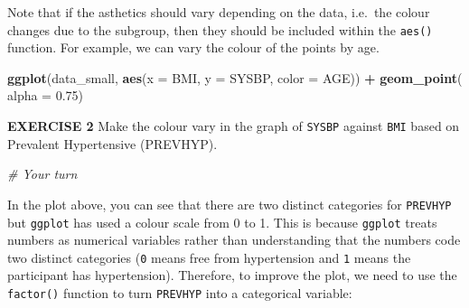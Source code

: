 \documentclass[
]{article}
\newenvironment{Shaded}{\begin{snugshade}}{\end{snugshade}}
\newcommand{\CommentTok}[1]{\textcolor[rgb]{0.56,0.35,0.01}{\textit{#1}}}
\newcommand{\DataTypeTok}[1]{\textcolor[rgb]{0.13,0.29,0.53}{#1}}
\newcommand{\DecValTok}[1]{\textcolor[rgb]{0.00,0.00,0.81}{#1}}
\newcommand{\FloatTok}[1]{\textcolor[rgb]{0.00,0.00,0.81}{#1}}
\newcommand{\KeywordTok}[1]{\textcolor[rgb]{0.13,0.29,0.53}{\textbf{#1}}}
\newcommand{\NormalTok}[1]{#1}
\newcommand{\OperatorTok}[1]{\textcolor[rgb]{0.81,0.36,0.00}{\textbf{#1}}}
\newcommand{\StringTok}[1]{\textcolor[rgb]{0.31,0.60,0.02}{#1}}
\begin{document}
Note that if the asthetics should vary depending on the data, i.e.~the
colour changes due to the subgroup, then they should be included within
the \texttt{aes()} function. For example, we can vary the colour of the
points by age.

\begin{Shaded}
\begin{Highlighting}[]
\KeywordTok{ggplot}\NormalTok{(data_small, }
       \KeywordTok{aes}\NormalTok{(}\DataTypeTok{x =}\NormalTok{ BMI, }\DataTypeTok{y =}\NormalTok{ SYSBP, }\DataTypeTok{color =}\NormalTok{ AGE)) }\OperatorTok{+}\StringTok{ }
\StringTok{  }\KeywordTok{geom_point}\NormalTok{( }\DataTypeTok{alpha =} \FloatTok{0.75}\NormalTok{) }
\end{Highlighting}
\end{Shaded}

\textbf{EXERCISE 2} Make the colour vary in the graph of \texttt{SYSBP}
against \texttt{BMI} based on Prevalent Hypertensive (PREVHYP).

\begin{Shaded}
\begin{Highlighting}[]
\CommentTok{# Your turn}
\end{Highlighting}
\end{Shaded}

In the plot above, you can see that there are two distinct categories
for \texttt{PREVHYP} but \texttt{ggplot} has used a colour scale from 0
to 1. This is because \texttt{ggplot} treats numbers as numerical
variables rather than understanding that the numbers code two distinct
categories (\texttt{0} means free from hypertension and \texttt{1} means
the participant has hypertension). Therefore, to improve the plot, we
need to use the \texttt{factor()} function to turn \texttt{PREVHYP} into
a categorical variable:

\begin{Shaded}
\end{Shaded}
\end{document}
